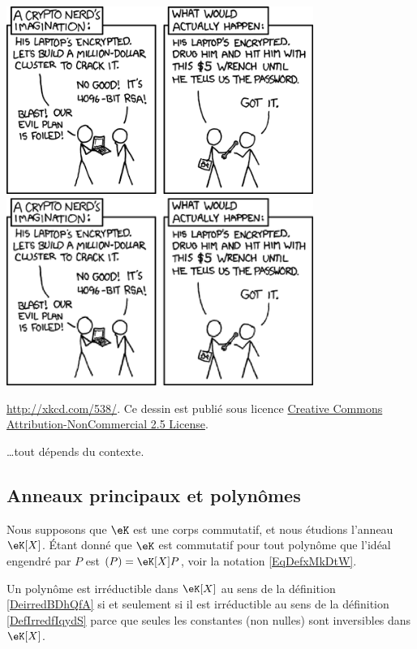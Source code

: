\begin{center}
        \ifpdf
            \includegraphics[width=10cm]{security.png}
        \else
            \includegraphics[width=10cm]{security.eps}
        \fi

        \url{http://xkcd.com/538/}. Ce dessin est publié sous licence \href{http://creativecommons.org/licenses/by-nc/2.5/}{ Creative Commons Attribution-NonCommercial 2.5 License}.
\end{center}

\noindent \ldots tout dépends du contexte.

\subsection{Anneaux principaux et polynômes}

Nous supposons que \( \eK\) est une corps commutatif, et nous étudions l'anneau \( \eK[X]\). Étant donné que \( \eK\) est commutatif pour tout polynôme que l'idéal engendré par \( P\) est \( (P)=\eK[X]P\), voir la notation \eqref{EqDefxMkDtW}.

\begin{remark}
    Un polynôme est irréductible dans \( \eK[X]\) au sens de la définition \ref{DeirredBDhQfA} si et seulement si il est irréductible au sens de la définition \ref{DefIrredfIqydS} parce que seules les constantes (non nulles) sont inversibles dans \( \eK[X]\).
\end{remark}

